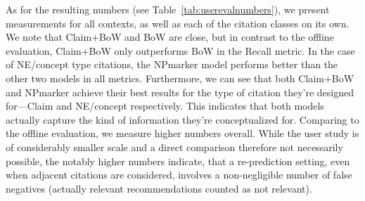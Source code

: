 As for the resulting numbers (see Table~\ref{tab:userevalnumbers}), we present measurements for all contexts, as well as each of the citation classes on its own. We note that Claim+BoW and BoW are close, but in contrast to the offline evaluation, Claim+BoW only outperforms BoW in the Recall metric. In the case of NE/concept type citations, the NPmarker model performs better than the other two models in all metrics. Furthermore, we can see that both Claim+BoW and NPmarker achieve their best results for the type of citation they're designed for---Claim and NE/concept respectively. This indicates that both models actually capture the kind of information they're conceptualized for. Comparing to the offline evaluation, we measure higher numbers overall. While the user study is of considerably smaller scale and a direct comparison therefore not necessarily possible, the notably higher numbers indicate, that a re-prediction setting, even when adjacent citations are considered, involves a non-negligible number of false negatives (actually relevant recommendations counted as not relevant).
